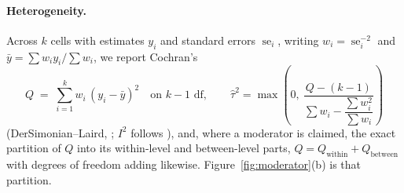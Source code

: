 \documentclass[10pt,letterpaper]{article}
\DeclareMathOperator{\se}{se}
\begin{document}
\paragraph{Heterogeneity.}
Across $k$ cells with estimates $y_i$ and standard errors $\se_i$, writing
$w_i = \se_i^{-2}$ and $\bar{y} = \sum w_i y_i / \sum w_i$, we report Cochran's
\citep{cochran1954combination}
\begin{equation}
Q\;=\;\sum_{i=1}^{k} w_i\,(y_i-\bar{y})^2
\quad\text{on } k-1 \text{ df},
\qquad
\hat\tau^{2}=\max\!\left(0,\ \frac{Q-(k-1)}{\sum w_i-\dfrac{\sum w_i^{2}}{\sum w_i}}\right)
\label{eq:Q}
\end{equation}
(DerSimonian--Laird, \citealp{dersimonian1986meta}; $I^2$ follows
\citealp{higgins2002quantifying}), and, where a moderator is claimed, the exact partition of $Q$
into its within-level and between-level parts,
$Q = Q_{\mathrm{within}} + Q_{\mathrm{between}}$ with degrees of freedom adding likewise.
Figure~\ref{fig:moderator}(b) is that partition.
\end{document}
